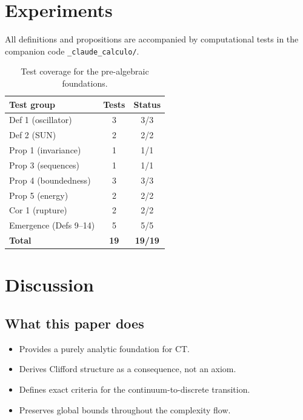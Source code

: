 \documentclass[11pt,a4paper]{article}
\begin{document}
\section{Experiments}

All definitions and propositions are accompanied by computational
tests in the companion code \texttt{\_claude\_calculo/}.

\begin{table}[ht]
\centering
\begin{tabular}{lcc}
\hline
\textbf{Test group} & \textbf{Tests} & \textbf{Status} \\
\hline
Def 1 (oscillator)     & 3  & 3/3  \\
Def 2 (SUN)            & 2  & 2/2  \\
Prop 1 (invariance)    & 1  & 1/1  \\
Prop 3 (sequences)     & 1  & 1/1  \\
Prop 4 (boundedness)   & 3  & 3/3  \\
Prop 5 (energy)        & 2  & 2/2  \\
Cor 1 (rupture)        & 2  & 2/2  \\
Emergence (Defs 9--14) & 5  & 5/5  \\
\hline
\textbf{Total}         & \textbf{19} & \textbf{19/19} \\
\hline
\end{tabular}
\caption{Test coverage for the pre-algebraic foundations.}
\end{table}

\section{Discussion}

\subsection{What this paper does}
\begin{itemize}
\item Provides a purely analytic foundation for CT.
\item Derives Clifford structure as a consequence, not an axiom.
\item Defines exact criteria for the continuum-to-discrete transition.
\item Preserves global bounds throughout the complexity flow.
\end{itemize}
\end{document}
